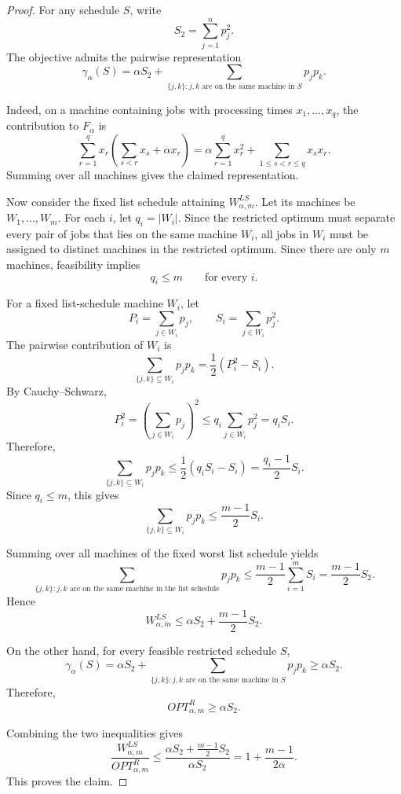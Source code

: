\documentclass[11pt]{article}
\begin{document}
\begin{proof}
For any schedule \(S\), write
\[
S_2=\sum_{j=1}^n p_j^2.
\]
The objective admits the pairwise representation
\[
\gamma_{\alpha}(S)
=
\alpha S_2
+
\sum_{\{j,k\}: j,k \text{ are on the same machine in } S} p_jp_k.
\]

Indeed, on a machine containing jobs with processing times
\(x_1,\dots,x_q\), the contribution to \(F_\alpha\) is
\[
\sum_{r=1}^q x_r
\left(
\sum_{s<r}x_s+\alpha x_r
\right)
=
\alpha\sum_{r=1}^q x_r^2
+
\sum_{1\le s<r\le q}x_sx_r.
\]
Summing over all machines gives the claimed representation.

Now consider the fixed list schedule attaining \(W^{LS}_{\alpha,m}\). Let its
machines be \(W_1,\dots,W_m\). For each \(i\), let \(q_i=|W_i|\). Since the
restricted optimum must separate every pair of jobs that lies on the same
machine \(W_i\), all jobs in \(W_i\) must be assigned to distinct machines in
the restricted optimum. Since there are only \(m\) machines, feasibility
implies
\[
q_i\le m
\qquad
\text{for every } i.
\]

For a fixed list-schedule machine \(W_i\), let
\[
P_i=\sum_{j\in W_i}p_j,
\qquad
S_i=\sum_{j\in W_i}p_j^2.
\]
The pairwise contribution of \(W_i\) is
\[
\sum_{\{j,k\}\subseteq W_i}p_jp_k
=
\frac12\left(P_i^2-S_i\right).
\]
By Cauchy--Schwarz,
\[
P_i^2
=
\left(\sum_{j\in W_i}p_j\right)^2
\le
q_i \sum_{j\in W_i}p_j^2
=
q_i S_i.
\]
Therefore,
\[
\sum_{\{j,k\}\subseteq W_i}p_jp_k
\le
\frac12(q_iS_i-S_i)
=
\frac{q_i-1}{2}S_i.
\]
Since \(q_i\le m\), this gives
\[
\sum_{\{j,k\}\subseteq W_i}p_jp_k
\le
\frac{m-1}{2}S_i.
\]

Summing over all machines of the fixed worst list schedule yields
\[
\sum_{\{j,k\}: j,k \text{ are on the same machine in the list schedule}}
p_jp_k
\le
\frac{m-1}{2}\sum_{i=1}^m S_i
=
\frac{m-1}{2}S_2.
\]
Hence
\[
W^{LS}_{\alpha,m}
\le
\alpha S_2+\frac{m-1}{2}S_2.
\]

On the other hand, for every feasible restricted schedule \(S\),
\[
\gamma_{\alpha}(S)
=
\alpha S_2
+
\sum_{\{j,k\}: j,k \text{ are on the same machine in }S}p_jp_k
\ge
\alpha S_2.
\]
Therefore,
\[
OPT^R_{\alpha,m}\ge \alpha S_2.
\]

Combining the two inequalities gives
\[
\frac{W^{LS}_{\alpha,m}}{OPT^R_{\alpha,m}}
\le
\frac{\alpha S_2+\frac{m-1}{2}S_2}{\alpha S_2}
=
1+\frac{m-1}{2\alpha}.
\]
This proves the claim.
\end{proof}
\end{document}
